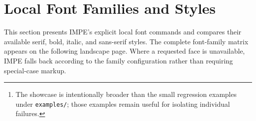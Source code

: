 \maketitle

\begin{abstract}
This document is the canonical visual specimen for the current IMPE \LaTeX~System public interface. It combines a local-family style audit, a deliberately
small Unicode-range routing regression, dense multilingual paragraph
composition with explicit local overrides, right-to-left text, vertical
writing, generic complex shaping, CJK and Han family selection, and the
principal document features provided by IMPE. It is intended both as a public
showcase and as a release-time visual regression specimen.\footnote{The
showcase is intentionally broader than the small regression examples under
\texttt{examples/}; those examples remain useful for isolating individual
failures.}
\end{abstract}

\tableofcontents



\section{Local Font Families and Styles}

This section presents IMPE's explicit local font commands and compares their
available serif, bold, italic, and sans-serif styles. The complete font-family
matrix appears on the following landscape page. Where a requested face is
unavailable, IMPE falls back according to the family configuration rather than
requiring special-case markup.

